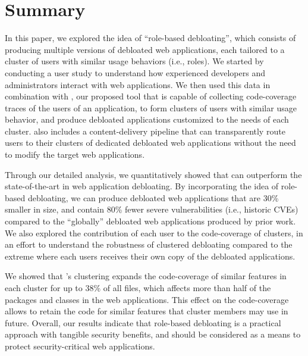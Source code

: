 \section{Summary}

In this paper, we explored the idea of ``role-based debloating'', which consists of producing multiple versions of debloated web applications, each tailored to a cluster of users with similar usage behaviors (i.e., roles). 
We started by conducting a user study to understand how experienced developers and administrators interact with web applications. 
We then used this data in combination with \sys{}, our proposed tool that is capable of collecting code-coverage traces of the users of an application, to form clusters of users with similar usage behavior, and produce debloated applications customized to the needs of each cluster. 
\sys{} also includes a content-delivery pipeline that can transparently route users to their clusters of dedicated debloated web applications without the need to modify the target web applications. 

Through our detailed analysis, we quantitatively showed that \sys{} can outperform the state-of-the-art in web application debloating. 
By incorporating the idea of role-based debloating, we can produce debloated web applications that are 30\% smaller in size, and contain 80\% fewer severe vulnerabilities (i.e., historic CVEs) compared to the ``globally'' debloated web applications produced by prior work. We also explored the contribution of each user to the code-coverage of clusters, in an effort to understand the robustness of clustered debloating compared to the extreme where each users receives their own copy of the debloated applications. 

We showed that \sys{}'s clustering expands the code-coverage of similar features in each cluster for up to 38\% of all files, which affects more than half of the packages and classes in the web applications. This effect on the code-coverage allows \sys{} to retain the code for similar features that cluster members may use in future. 
Overall, our results indicate that role-based debloating is a practical approach with tangible security benefits, and should be considered as a means to protect security-critical web applications. 

